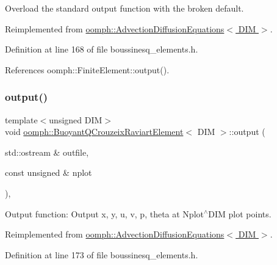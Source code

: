 Overload the standard output function with the broken default. 



Reimplemented from \hyperlink{classoomph_1_1AdvectionDiffusionEquations_a3016c7a56e7f7178b4d9ae8604d0c10b}{oomph\+::\+Advection\+Diffusion\+Equations$<$ D\+I\+M $>$}.



Definition at line 168 of file boussinesq\+\_\+elements.\+h.



References oomph\+::\+Finite\+Element\+::output().

\mbox{\label{classoomph_1_1BuoyantQCrouzeixRaviartElement_a855783400ac22a61e151d1611ad8e47e}} 
\subsubsection{\texorpdfstring{output()}{output()}\hspace{0.1cm}{\footnotesize\ttfamily [2/4]}}
{\footnotesize\ttfamily template$<$unsigned D\+IM$>$ \\
void \hyperlink{classoomph_1_1BuoyantQCrouzeixRaviartElement}{oomph\+::\+Buoyant\+Q\+Crouzeix\+Raviart\+Element}$<$ D\+IM $>$\+::output (\begin{DoxyParamCaption}\item[{std\+::ostream \&}]{outfile,  }\item[{const unsigned \&}]{nplot }\end{DoxyParamCaption})\hspace{0.3cm}{\ttfamily [inline]}, {\ttfamily [virtual]}}



Output function\+: Output x, y, u, v, p, theta at Nplot$^\wedge$\+D\+IM plot points. 



Reimplemented from \hyperlink{classoomph_1_1AdvectionDiffusionEquations_ade5e445c7b99593a68fc8e42631d79be}{oomph\+::\+Advection\+Diffusion\+Equations$<$ D\+I\+M $>$}.



Definition at line 173 of file boussinesq\+\_\+elements.\+h.



